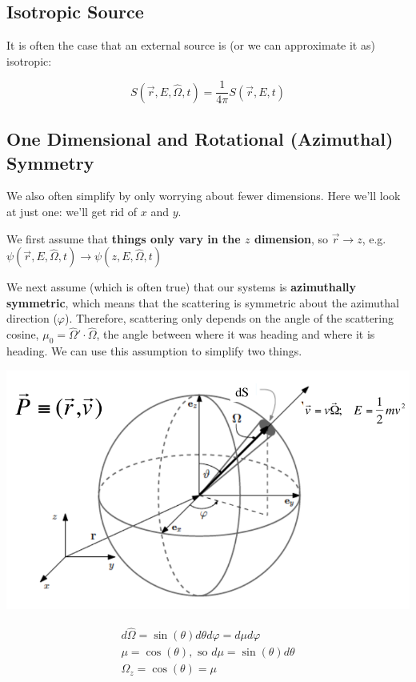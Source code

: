 \documentclass[12pt]{article}
\newcommand{\vOmega}{\ensuremath{\hat{\Omega}}}
\newlength\Colsep
\begin{document}
\subsection*{Isotropic Source}

It is often the case that an external source is (or we can approximate it as)
isotropic:

\[ S(\vec{r}, E, \vOmega, t) = \frac{1}{4 \pi}  S(\vec{r}, E, t) \]

\subsection*{One Dimensional and Rotational (Azimuthal) Symmetry}

We also often simplify by only worrying about fewer dimensions. Here we'll 
look at just one: we'll get rid of $x$ and $y$. 

We first assume that \textbf{things only vary in the $z$ dimension}, so
$\vec{r} \rightarrow z$, e.g.
$\psi(\vec{r}, E, \vOmega, t) \rightarrow \psi(z, E, \vOmega, t)$

We next assume (which is often true) that our systems is \textbf{azimuthally
symmetric}, which means that the scattering is symmetric about the azimuthal
direction ($\varphi$). Therefore, scattering only depends on the angle of the
scattering cosine, $\mu_0 =\vOmega' \cdot \vOmega$, the angle between where it
was heading and where it is heading. We can use this assumption to simplify
two things. 

\noindent\begin{minipage}{\textwidth}
\begin{minipage}[c][6cm][c]{\dimexpr0.5\textwidth-0.5\Colsep\relax}
    \begin{center}
    \includegraphics[keepaspectratio, width = 3 in]{phase-space}
    \end{center}
\end{minipage}\hfill
\begin{minipage}[c][6cm][c]{\dimexpr0.5\textwidth-0.5\Colsep\relax}
\begin{gather*}
d\vOmega = \sin(\theta) d\theta d\varphi = d\mu d\varphi \\
\mu = \cos(\theta), \text{ so } d\mu = \sin(\theta)d\theta \\
\Omega_z = \cos(\theta) = \mu
\end{gather*}
\end{minipage}%
\end{minipage}
\end{document}
